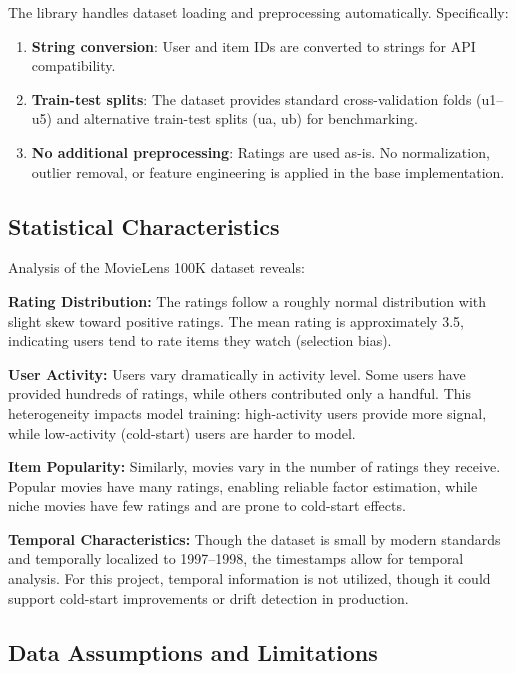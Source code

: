 The  library handles dataset loading and preprocessing automatically. Specifically:

\begin{enumerate}
  \item \textbf{String conversion}: User and item IDs are converted to strings for API compatibility.
  \item \textbf{Train-test splits}: The dataset provides standard cross-validation folds (u1--u5) and 
  alternative train-test splits (ua, ub) for benchmarking.
  \item \textbf{No additional preprocessing}: Ratings are used as-is. No normalization, outlier removal, 
  or feature engineering is applied in the base implementation.
\end{enumerate}

\subsection{Statistical Characteristics}

Analysis of the MovieLens 100K dataset reveals:

\textbf{Rating Distribution:}
The ratings follow a roughly normal distribution with slight skew toward positive ratings. The mean rating 
is approximately 3.5, indicating users tend to rate items they watch (selection bias).

\textbf{User Activity:}
Users vary dramatically in activity level. Some users have provided hundreds of ratings, while others 
contributed only a handful. This heterogeneity impacts model training: high-activity users provide more 
signal, while low-activity (cold-start) users are harder to model.

\textbf{Item Popularity:}
Similarly, movies vary in the number of ratings they receive. Popular movies have many ratings, enabling 
reliable factor estimation, while niche movies have few ratings and are prone to cold-start effects.

\textbf{Temporal Characteristics:}
Though the dataset is small by modern standards and temporally localized to 1997--1998, the timestamps allow 
for temporal analysis. For this project, temporal information is not utilized, though it could support 
cold-start improvements or drift detection in production.

\subsection{Data Assumptions and Limitations}

